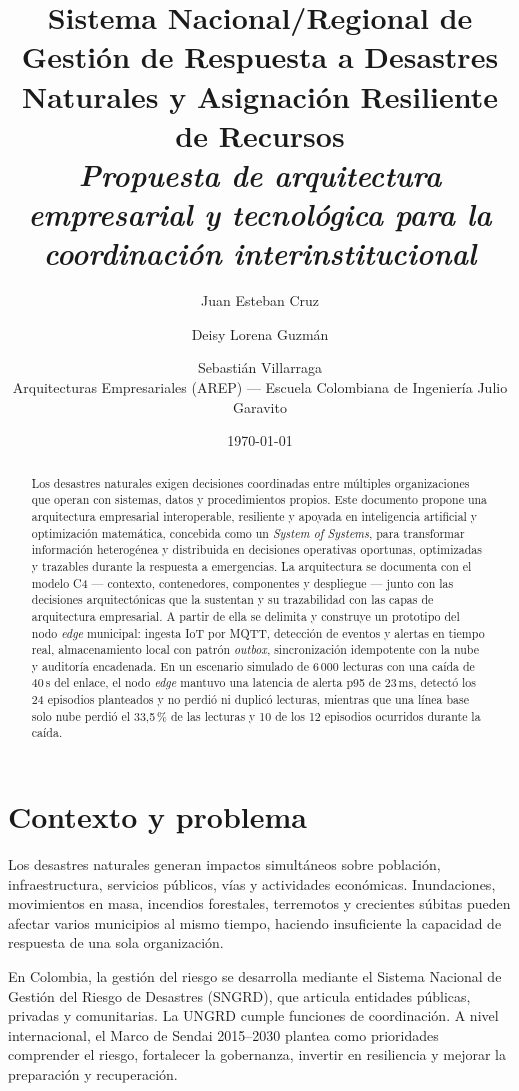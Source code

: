 \documentclass[11pt,a4paper]{article}
\title{\textbf{Sistema Nacional/Regional de Gestión de Respuesta a Desastres
Naturales y Asignación Resiliente de Recursos}\\[0.4em]
\large\normalfont\itshape Propuesta de arquitectura empresarial y tecnológica
para la coordinación interinstitucional}
\author{Juan Esteban Cruz \and Deisy Lorena Guzmán \and Sebastián Villarraga \\[0.3em]
\small Arquitecturas Empresariales (AREP) --- Escuela Colombiana de Ingeniería Julio Garavito}
\date{\today}
\begin{document}
\maketitle

\begin{abstract}
\noindent
Los desastres naturales exigen decisiones coordinadas entre múltiples
organizaciones que operan con sistemas, datos y procedimientos propios.
Este documento propone una arquitectura empresarial interoperable,
resiliente y apoyada en inteligencia artificial y optimización matemática,
concebida como un \emph{System of Systems}, para transformar información
heterogénea y distribuida en decisiones operativas oportunas, optimizadas y
trazables durante la respuesta a emergencias. La arquitectura se documenta con
el modelo C4 --- contexto, contenedores, componentes y despliegue --- junto con
las decisiones arquitectónicas que la sustentan y su trazabilidad con las capas
de arquitectura empresarial. A partir de ella se delimita y construye un
prototipo del nodo \emph{edge} municipal: ingesta IoT por MQTT, detección de
eventos y alertas en tiempo real, almacenamiento local con patrón
\emph{outbox}, sincronización idempotente con la nube y auditoría encadenada.
En un escenario simulado de 6\,000 lecturas con una caída de 40\,s del enlace,
el nodo \emph{edge} mantuvo una latencia de alerta p95 de 23\,ms, detectó los
24 episodios planteados y no perdió ni duplicó lecturas, mientras que una línea
base solo nube perdió el 33,5\,\% de las lecturas y 10 de los 12 episodios
ocurridos durante la caída.
\end{abstract}

\tableofcontents
\listoffigures
\bigskip

\section{Contexto y problema}

Los desastres naturales generan impactos simultáneos sobre población,
infraestructura, servicios públicos, vías y actividades económicas.
Inundaciones, movimientos en masa, incendios forestales, terremotos y
crecientes súbitas pueden afectar varios municipios al mismo tiempo,
haciendo insuficiente la capacidad de respuesta de una sola organización.

En Colombia, la gestión del riesgo se desarrolla mediante el Sistema Nacional
de Gestión del Riesgo de Desastres (SNGRD), que articula entidades públicas,
privadas y comunitarias. La UNGRD cumple funciones de coordinación. A nivel
internacional, el Marco de Sendai 2015--2030 plantea como prioridades
comprender el riesgo, fortalecer la gobernanza, invertir en resiliencia y
mejorar la preparación y recuperación.
\end{document}
